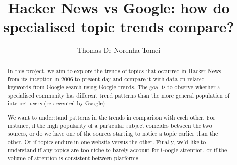\documentclass[nonacm,sigconf]{acmart}
\begin{document}
\title{Hacker News vs Google: how do specialised topic trends compare?}

\author{Thomas De Noronha Tomei}

\renewcommand{\shortauthors}{T. Tomei}

\begin{abstract}
    In this project, we aim to explore the trends of topics that occurred in Hacker News from its inception in 2006 to present day and compare it with data on related keywords from Google search using Google trends. The goal is to observe whether a specialised community has different trend patterns than the more general population of internet users (represented by Google)
    \par
    We want to understand patterns in the trends in comparison with each other. For instance, if the high popularity of a particular subject coincides between the two sources, or do we have one of the sources starting to notice a topic earlier than the other. Or if topics endure in one website versus the other. Finally, we'd like to understand if any topics are too niche to barely account for Google attention, or if the volume of attention is consistent between platforms
\end{abstract}


\maketitle
\end{document}
